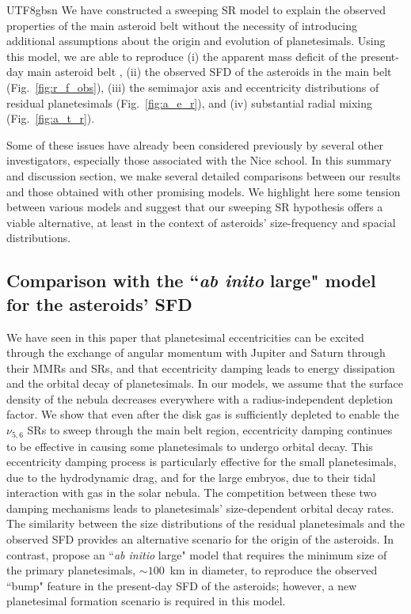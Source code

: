 \documentclass[tighten]{aastex6}
\begin{document}
\begin{CJK*}{UTF8}{gbsn}
We have constructed a sweeping SR model to explain the observed
properties of the main asteroid belt without the necessity of introducing
additional assumptions about the origin and evolution of planetesimals. Using 
this model, we are able to reproduce (i) the apparent mass deficit of 
the present-day main asteroid belt \citep[Fig.~\ref{fig:r_df}; see also][]{morbidelli2009}, (ii) the observed SFD 
of the asteroids in the main belt (Fig.~\ref{fig:r_f_obs}), (iii) the 
semimajor axis and eccentricity distributions of residual planetesimals 
(Fig.~\ref{fig:a_e_r}), and (iv) substantial radial mixing 
(Fig.~\ref{fig:a_t_r}).

Some of these issues have already been considered previously by several 
other investigators, especially those associated with the Nice school. 
In this summary and discussion section, we make several detailed comparisons 
between our results and those obtained with other promising models. We 
highlight here some tension between various models and suggest that 
our sweeping SR hypothesis offers a viable alternative, at least in 
the context of asteroids' size-frequency and spacial distributions.  


\subsection{Comparison with the ``{\it ab inito} large" model for the asteroids' SFD}
\label{sec:sum1}

We have seen in this paper that planetesimal eccentricities can 
be excited through the exchange of angular momentum with Jupiter and 
Saturn through their MMRs and SRs, and that eccentricity damping leads to 
energy dissipation and the orbital decay of planetesimals. In our models,
we assume that the surface density of the nebula decreases everywhere
with a radius-independent depletion factor.  We show that even after 
the disk gas is sufficiently depleted to enable the $\nu_{5,6}$ SRs
to sweep through the main belt region, eccentricity damping continues
to be effective in causing some planetesimals to undergo orbital decay.
This eccentricity damping process is particularly effective for the 
small planetesimals, due to the hydrodynamic drag, and for the 
large embryos, due to their tidal interaction with gas in the solar 
nebula. The competition between these two damping mechanisms leads 
to planetesimals' size-dependent orbital decay rates. The similarity 
between the size distributions of the residual planetesimals and 
the observed SFD provides an alternative scenario for the origin of 
the asteroids. In contrast, \citet{morbidelli2009} propose an ``{\it ab initio} large" model that requires the minimum size of the primary planetesimals, $\sim 100$~km in diameter, to reproduce the observed ``bump" feature in the present-day SFD of the asteroids; however, a new planetesimal formation scenario is required in this model.



\end{CJK*}
\end{document}
